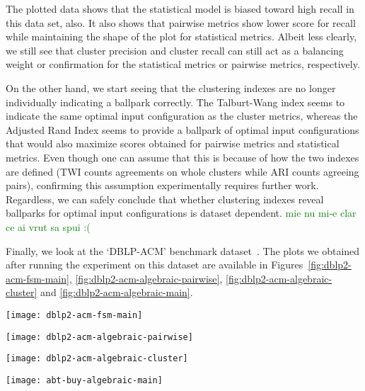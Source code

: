 The plotted data shows that the statistical model is biased toward high recall
in this data set, also.
It also shows that pairwise metrics show lower score for recall while
maintaining the shape of the plot for statistical metrics.
Albeit less clearly, we still see that cluster precision and cluster recall can
still act as a balancing weight or confirmation for the statistical metrics or
pairwise metrics, respectively.

On the other hand, we start seeing that the clustering indexes are no longer
individually indicating a ballpark correctly.
The Talburt-Wang index seems to indicate the same optimal input configuration as
the cluster metrics, whereas the Adjusted Rand Index seems to provide a ballpark
of optimal input configurations that would also maximize scores obtained for
pairwise metrics and statistical metrics.
Even though one can assume that this is because of how the two indexes are
defined (TWI counts agreements on whole clusters while ARI counts agreeing
pairs), confirming this assumption experimentally requires further work.
Regardless, we can safely conclude that whether clustering indexes reveal
ballparks for optimal input configurations is dataset dependent.
\textcolor{green}{mie nu mi-e clar ce ai vrut sa spui :(}

Finally, we look at the `DBLP-ACM' benchmark dataset~\cite{vldb2010}.
The plots we obtained after running the experiment on this dataset are available
in Figures~\ref{fig:dblp2-acm-fsm-main},
\ref{fig:dblp2-acm-algebraic-pairwise},
\ref{fig:dblp2-acm-algebraic-cluster} and
\ref{fig:dblp2-acm-algebraic-main}.

\begin{figure*}[h]
    \begin{minipage}{0.24\textwidth}
        \centering
        \texttt{[image: dblp2-acm-fsm-main]}
        \caption{DBLP-ACM statistical metrics.}
        \label{fig:dblp2-acm-fsm-main}
    \end{minipage}
    \begin{minipage}{0.24\textwidth}
        \centering
        \texttt{[image: dblp2-acm-algebraic-pairwise]}
        \caption{DBLP-ACM pairwise metrics.}
        \label{fig:dblp2-acm-algebraic-pairwise}
    \end{minipage}
    \begin{minipage}{0.24\textwidth}
        \centering
        \texttt{[image: dblp2-acm-algebraic-cluster]}
        \caption{DBLP-ACM cluster metrics.}
        \label{fig:dblp2-acm-algebraic-cluster}
    \end{minipage}
    \begin{minipage}{0.24\textwidth}
        \centering
        \texttt{[image: abt-buy-algebraic-main]}
        \caption{DBLP-ACM clustering indexes.}
        \label{fig:dblp2-acm-algebraic-main}
    \end{minipage}
\end{figure*}\label{dblp2-acm}

